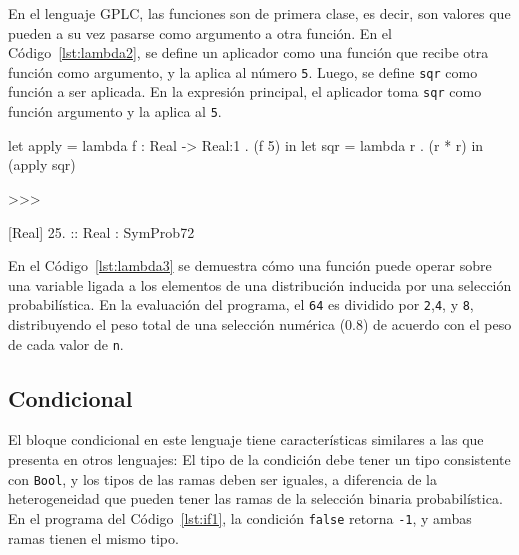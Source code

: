 En el lenguaje GPLC, las funciones son de primera clase, es decir, son
valores que pueden a su vez pasarse como argumento a otra
función. En el Código~\ref{lst:lambda2}, se define un aplicador como
una función que recibe otra función como argumento, y la aplica al
número \lstinline|5|. Luego, se define \lstinline|sqr| como función a
ser aplicada. En la expresión principal, el aplicador toma
\lstinline|sqr| como función argumento y la aplica al \lstinline|5|.

\begin{gplcblock}[caption={Función como argumento de otra función},label={lst:lambda2}]
let apply = lambda f : Real -> {Real:1} . (f 5) in
let sqr = lambda r . (r * r) in
(apply sqr)

>>>

{
	 [Real] 25. :: Real : SymProb72 
}  

\end{gplcblock}





En el Código~\ref{lst:lambda3} se demuestra cómo una función puede
operar sobre una variable ligada a los elementos de una distribución
inducida por una selección probabilística.  En la evaluación del
programa, el \lstinline|64| es dividido por
\lstinline|2|,\lstinline|4|, y \lstinline|8|, distribuyendo el peso
total de una selección numérica (0.8) de acuerdo con el peso de cada valor
de \lstinline|n|.




\subsection{Condicional}

El bloque condicional en este lenguaje tiene
características similares a las que presenta
en otros lenguajes: El tipo de la condición
debe tener un tipo consistente con \lstinline|Bool|, y
los tipos de las ramas deben ser iguales, a
diferencia de la heterogeneidad que pueden tener
las ramas de la selección binaria probabilística.
En el programa del Código~\ref{lst:if1}, la condición \lstinline|false| retorna \lstinline|-1|,
y ambas ramas tienen el mismo tipo.


